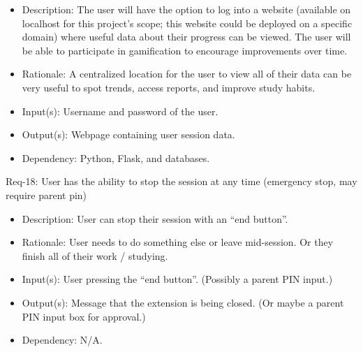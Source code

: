 \documentclass[12pt]{article}
\begin{document}
\begin{itemize}
    \item Description: The user will have the option to log into a website (available on localhost for this project's scope; this website could be deployed on a specific domain) where useful data about their progress can be viewed. The user will be able to participate in gamification to encourage improvements over time.
    \item Rationale: A centralized location for the user to view all of their data can be very useful to spot trends, access reports, and improve study habits.
    \item Input(s): Username and password of the user.
    \item Output(s): Webpage containing user session data.
    \item Dependency: Python, Flask, and databases.
\end{itemize}
Req-18: User has the ability to stop the session at any time (emergency stop, may require parent pin)
\begin{itemize}
    \item Description: User can stop their session with an “end button”.
    \item Rationale: User needs to do something else or leave mid-session. Or they finish all of their work / studying.
    \item Input(s): User pressing the “end button”. (Possibly a parent PIN input.)
    \item Output(s): Message that the extension is being closed. (Or maybe a parent PIN input box for approval.)
    \item Dependency: N/A.
\end{itemize}
\end{document}
